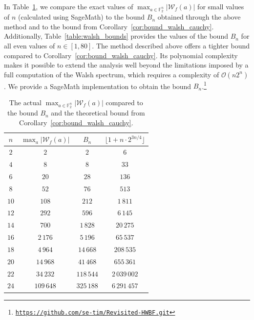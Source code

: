 \documentclass[runningheads,orivec]{llncs}
\newcommand{\F}{\mathbb{F}}
\newcommand{\myurl}[1]{\footnote{\texttt{\url{#1}}}}
\newcommand{\wt}[1]{\mathcal W_{#1}}
\begin{document}
    \bigskip
    
    In Table~\ref{table:max_walsh_vs_bound}, we compare the exact values of $\max_{a\in\mathbb F_2^n}|\wt f(a)|$ for small values of $n$ (calculated using \textsf{SageMath}) to the bound $B_n$ obtained through the above method and to the bound from Corollary~\ref{cor:bound_walsh_cauchy}. Additionally, Table~\ref{table:walsh_bounds} provides the values of the bound $B_n$ for all even values of $n\in[1,80]$. The method described above offers a tighter bound compared to Corollary~\ref{cor:bound_walsh_cauchy}. Its polynomial complexity makes it possible to extend the analysis well beyond the limitations imposed by a full computation of the Walsh spectrum, which requires a complexity of $\mathcal O(n2^n)$. We provide a \textsf{SageMath} implementation to obtain the bound $B_n$.\myurl{https://github.com/se-tim/Revisited-HWBF.git}
    
    \begin{table}
    	\scriptsize
    	\centering
        \caption{The actual $\max_{a\in\F_2^n}|\wt f(a)|$ compared to the bound $B_n$ and the theoretical bound from Corollary~\ref{cor:bound_walsh_cauchy}.}
    	\label{table:max_walsh_vs_bound}
    	\begin{tabular}{|c|c|c|c|}
    		\hline
    		$n$ & $\max_a|\wt f(a)|$ & $B_n$  & $\lfloor 1+n\cdot 2^{3n/4} \rfloor$\\
            \hline
            $2$&$2$&$2$&$6$\\
            $4$&$8$&$8$&$33$\\
            $6$&$20$&$28$&$136$\\
            $8$&$52$&$76$&$513$\\
            $10$&$108$&$212$&$1\,811$\\
            $12$&$292$&$596$&$6\,145$\\
            $14$&$700$&$1\,828$&$20\,275$\\
            $16$&$2\,176$&$5\,196$&$65\,537$\\
            $18$&$4\,964$&$14\,668$&$208\,535$\\
            $20$&$14\,968$&$41\,468$&$655\,361$\\
            $22$&$34\,232$&$118\,544$&$2\,039\,002$\\
            $24$&$109\,648$&$325\,188$&$6\,291\,457$\\
    		\hline
    	\end{tabular}
    \end{table}
    
\end{document}
